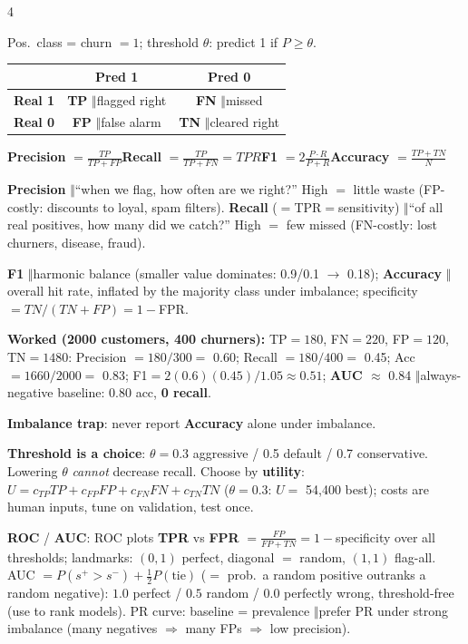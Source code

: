 \documentclass[a4paper,fontsize=8pt]{scrartcl}
\newenvironment{ul}{\begin{list}{\textbullet}{\setlength{\leftmargin}{1.05em}\setlength{\labelwidth}{0.6em}\setlength{\labelsep}{0.35em}\setlength{\itemsep}{0.45pt}\setlength{\parsep}{0pt}\setlength{\topsep}{0.65pt}\setlength{\partopsep}{0pt}}}{\end{list}}
\newcommand{\secR}[1]{\vspace{2.4pt}{\colorbox{hdrR}{\color{white}\bfseries\sffamily\scriptsize\ #1\ }}\par\vspace{1.4pt}}
\newcommand{\sep}{\ensuremath{\boldsymbol{\Vert}}}
\newcommand{\key}[1]{\colorbox{hl}{#1}}
\newcommand{\fn}[1]{\colorbox{hlp}{\textbf{#1}}}
\begin{document}
\begin{multicols*}{4}
\secR{L6 · CONFUSION MATRIX / METRICS}
Pos.\ class = churn $=1$; threshold $\theta$: predict 1 if $P\ge\theta$.\\[1pt]
{\footnotesize
\begin{tabular}{@{}l|c|c@{}}
 & \textbf{Pred 1} & \textbf{Pred 0}\\
\hline
\textbf{Real 1} & \textbf{TP} \sep flagged right & \textbf{FN} \sep missed\\
\textbf{Real 0} & \textbf{FP} \sep false alarm & \textbf{TN} \sep cleared right\\
\end{tabular}}
\fn{Precision} $=\frac{TP}{TP+FP}$\quad \fn{Recall} $=\frac{TP}{TP+FN}=TPR$\quad \fn{F1} $=2\frac{P\cdot R}{P+R}$\quad \fn{Accuracy} $=\frac{TP+TN}{N}$
\begin{ul}
\item \fn{Precision} \sep ``when we flag, how often are we right?'' High $=$ little waste (FP-costly: discounts to loyal, spam filters). \fn{Recall} ($=$TPR$=$sensitivity) \sep ``of all real positives, how many did we catch?'' High $=$ few missed (FN-costly: lost churners, disease, fraud).
\item \fn{F1} \sep harmonic balance (smaller value dominates: 0.9/0.1 $\to$ 0.18); \fn{Accuracy} \sep overall hit rate, inflated by the majority class under imbalance; specificity $=TN/(TN+FP)=1-$FPR.
\item \textbf{Worked (2000 customers, 400 churners):} TP$=180$, FN$=220$, FP$=120$, TN$=1480$: Precision $=180/300=$ \key{0.60}; Recall $=180/400=$ \key{0.45}; Acc $=1660/2000=$ \key{0.83}; F1$=2(0.6)(0.45)/1.05\approx0.51$; \textbf{AUC $\approx$} \key{0.84} \sep always-negative baseline: $0.80$ acc, \textbf{0 recall}.
\item \textbf{Imbalance trap}: never report \fn{Accuracy} alone under imbalance.
\item \textbf{Threshold is a choice}: $\theta=0.3$ aggressive / 0.5 default / 0.7 conservative. Lowering $\theta$ \emph{cannot} decrease recall. Choose by \fn{utility}: $U=c_{TP}TP+c_{FP}FP+c_{FN}FN+c_{TN}TN$ ($\theta{=}0.3$: $U=$ \key{54{,}400} best); costs are human inputs, tune on validation, test once.
\item \fn{ROC} / \fn{AUC}: ROC plots \fn{TPR} vs \fn{FPR} $=\frac{FP}{FP+TN}=1-$specificity over all thresholds; landmarks: $(0,1)$ perfect, diagonal $=$ random, $(1,1)$ flag-all. AUC $=P(s^+>s^-)+\frac12P(\text{tie})$ ($=$ prob.\ a random positive outranks a random negative): $1.0$ perfect / $0.5$ random / $0.0$ perfectly wrong, threshold-free (use to rank models). PR curve: baseline = prevalence \sep prefer PR under strong imbalance (many negatives $\Rightarrow$ many FPs $\Rightarrow$ low precision).

\end{ul}
\end{multicols*}
\end{document}
